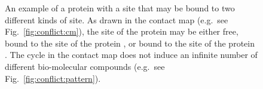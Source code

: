 \documentclass{entcs}
\begin{document}
\begin{figure}
{\begin{minipage}{0.74\linewidth}
  \hspace*{3mm}%
  \hspace*{3mm}%
  \hspace*{3mm}%
  \hspace*{3mm}%

\end{minipage}}
\caption{An example of a protein with a site that may be bound to two different kinds of site. As drawn in the contact map (e.g.~see Fig.~\ref{fig:conflict:cm}), the site of the protein  may be either free, bound to the site  of the protein , or bound to the site  of the protein . The cycle in the contact map does not induce an infinite number of different bio-molecular compounds (e.g.~see Fig.~\ref{fig:conflict:pattern}). }
\end{figure}
\end{document}
